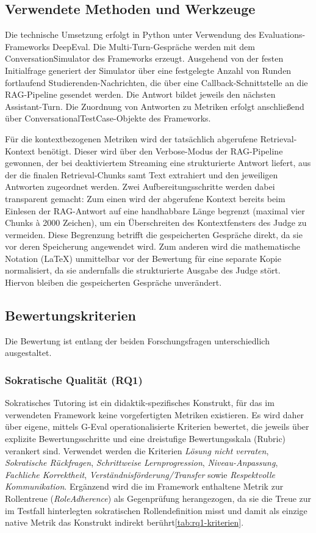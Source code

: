 \subsection{Verwendete Methoden und Werkzeuge}
\label{subsec:methoden}

Die technische Umsetzung erfolgt in Python unter Verwendung des
Evaluations-Frameworks DeepEval. Die Multi-Turn-Gespräche
werden mit dem ConversationSimulator des Frameworks erzeugt. Ausgehend von der
festen Initialfrage generiert der Simulator über eine festgelegte Anzahl von Runden
fortlaufend Studierenden-Nachrichten, die über eine Callback-Schnittstelle an die
RAG-Pipeline gesendet werden. Die Antwort bildet jeweils den nächsten
Assistant-Turn. Die Zuordnung von Antworten zu Metriken erfolgt anschließend über
ConversationalTestCase-Objekte des Frameworks.

Für die kontextbezogenen Metriken wird der tatsächlich abgerufene Retrieval-Kontext
benötigt. Dieser wird über den Verbose-Modus der RAG-Pipeline gewonnen, der bei
deaktiviertem Streaming eine strukturierte Antwort liefert, aus der die finalen
Retrieval-Chunks samt Text extrahiert und den jeweiligen Antworten zugeordnet werden.
Zwei Aufbereitungsschritte werden dabei transparent gemacht: Zum einen wird der abgerufene Kontext bereits beim Einlesen der RAG-Antwort auf eine handhabbare Länge begrenzt (maximal vier Chunks à 2000 Zeichen), um ein Überschreiten des Kontextfensters des Judge zu vermeiden. Diese Begrenzung betrifft die gespeicherten Gespräche direkt, da sie vor deren Speicherung angewendet wird. Zum anderen wird die mathematische Notation (LaTeX) unmittelbar vor der Bewertung für eine separate Kopie normalisiert, da sie andernfalls die strukturierte Ausgabe des Judge stört. Hiervon bleiben die gespeicherten Gespräche unverändert.
\subsection{Bewertungskriterien}
\label{subsec:kriterien}

Die Bewertung ist entlang der beiden Forschungsfragen unterschiedlich ausgestaltet.

\subsubsection{Sokratische Qualität (RQ1)}

Sokratisches Tutoring ist ein didaktik-spezifisches Konstrukt, für das im verwendeten
Framework keine vorgefertigten Metriken existieren. Es wird daher über eigene, mittels
G-Eval operationalisierte Kriterien bewertet, die jeweils über
explizite Bewertungsschritte und eine dreistufige Bewertungsskala (Rubric) verankert
sind. Verwendet werden die Kriterien \emph{Lösung nicht verraten}, \emph{Sokratische
Rückfragen}, \emph{Schrittweise Lernprogression}, \emph{Niveau-Anpassung},
\emph{Fachliche Korrektheit}, \emph{Verständnisförderung/Transfer} sowie
\emph{Respektvolle Kommunikation}. Ergänzend wird die im Framework enthaltene Metrik
zur Rollentreue (\emph{RoleAdherence}) als Gegenprüfung herangezogen, da sie die Treue
zur im Testfall hinterlegten sokratischen Rollendefinition misst und damit als einzige
native Metrik das Konstrukt indirekt berührt\ref{tab:rq1-kriterien}.

